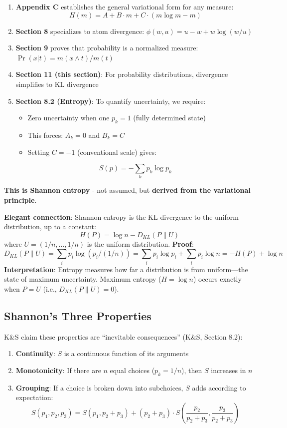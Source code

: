 \documentclass[11pt]{article}
\theoremstyle{definition}
\theoremstyle{remark}
\begin{document}
\begin{enumerate}
\item \textbf{Appendix C} establishes the general variational form for any measure:
\[ H(m) = A + B \cdot m + C \cdot (m \log m - m) \]

\item \textbf{Section 8} specializes to atom divergence: $\phi(w, u) = u - w + w \log(w/u)$

\item \textbf{Section 9} proves that probability is a normalized measure: $\Pr(x|t) = m(x \wedge t) / m(t)$

\item \textbf{Section 11 (this section)}: For probability distributions, divergence simplifies to KL divergence

\item \textbf{Section 8.2 (Entropy)}: To quantify uncertainty, we require:
\begin{itemize}
\item Zero uncertainty when one $p_k = 1$ (fully determined state)
\item This forces: $A_k = 0$ and $B_k = C$
\item Setting $C = -1$ (conventional scale) gives:
\end{itemize}
\[ S(p) = -\sum_k p_k \log p_k \]
\end{enumerate}

\textbf{This is Shannon entropy} - not assumed, but \textbf{derived from the variational principle}.

\textbf{Elegant connection}: Shannon entropy is the KL divergence to the uniform distribution, up to a constant:
\[ H(P) = \log n - D_{KL}(P \| U) \]
where $U = (1/n, \ldots, 1/n)$ is the uniform distribution. \textbf{Proof}:
\[ D_{KL}(P \| U) = \sum_i p_i \log(p_i / (1/n)) = \sum_i p_i \log p_i + \sum_i p_i \log n = -H(P) + \log n \]
\textbf{Interpretation}: Entropy measures how far a distribution is from uniform---the state of maximum uncertainty. Maximum entropy ($H = \log n$) occurs exactly when $P = U$ (i.e., $D_{KL}(P \| U) = 0$).

\subsection{Shannon's Three Properties}

K\&S claim these properties are ``inevitable consequences'' (K\&S, Section 8.2):

\begin{enumerate}
\item \textbf{Continuity}: $S$ is a continuous function of its arguments
\item \textbf{Monotonicity}: If there are $n$ equal choices ($p_k = 1/n$), then $S$ increases in $n$
\item \textbf{Grouping}: If a choice is broken down into subchoices, $S$ adds according to expectation:
\[ S(p_1, p_2, p_3) = S(p_1, p_2+p_3) + (p_2+p_3) \cdot S\left(\frac{p_2}{p_2+p_3}, \frac{p_3}{p_2+p_3}\right) \]
\end{enumerate}
\end{document}
